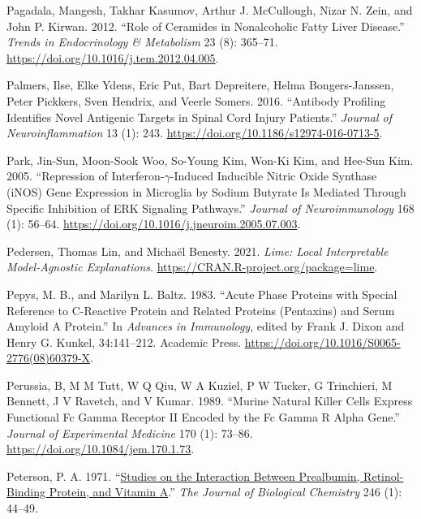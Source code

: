 \documentclass[9pt,lineno]{elife}
\newlength{\cslhangindent}
\newlength{\cslentryspacingunit} %
\newenvironment{CSLReferences}[2] %
 {%
  \setlength{\parindent}{0pt}
  \ifodd #1
  \let\oldpar\par
  \def\par{\hangindent=\cslhangindent\oldpar}
  \fi
  \setlength{\parskip}{#2\cslentryspacingunit}
 }%
 {}
\begin{document}
\begin{CSLReferences}{1}{0}
\leavevmode{}%
Pagadala, Mangesh, Takhar Kasumov, Arthur J. McCullough, Nizar N. Zein, and John P. Kirwan. 2012. {``Role of Ceramides in Nonalcoholic Fatty Liver Disease.''} \emph{Trends in Endocrinology \& Metabolism} 23 (8): 365--71. \url{https://doi.org/10.1016/j.tem.2012.04.005}.

\leavevmode{}%
Palmers, Ilse, Elke Ydens, Eric Put, Bart Depreitere, Helma Bongers-Janssen, Peter Pickkers, Sven Hendrix, and Veerle Somers. 2016. {``Antibody Profiling Identifies Novel Antigenic Targets in Spinal Cord Injury Patients.''} \emph{Journal of Neuroinflammation} 13 (1): 243. \url{https://doi.org/10.1186/s12974-016-0713-5}.

\leavevmode{}%
Park, Jin-Sun, Moon-Sook Woo, So-Young Kim, Won-Ki Kim, and Hee-Sun Kim. 2005. {``Repression of Interferon-{\(\gamma\)}-Induced Inducible Nitric Oxide Synthase ({iNOS}) Gene Expression in Microglia by Sodium Butyrate Is Mediated Through Specific Inhibition of {ERK} Signaling Pathways.''} \emph{Journal of Neuroimmunology} 168 (1): 56--64. \url{https://doi.org/10.1016/j.jneuroim.2005.07.003}.

\leavevmode{}%
Pedersen, Thomas Lin, and Michaël Benesty. 2021. \emph{Lime: Local Interpretable Model-Agnostic Explanations}. \url{https://CRAN.R-project.org/package=lime}.

\leavevmode{}%
Pepys, M. B., and Marilyn L. Baltz. 1983. {``Acute {Phase Proteins} with {Special Reference} to {C-Reactive Protein} and {Related Proteins} ({Pentaxins}) and {Serum Amyloid A Protein}.''} In \emph{Advances in {Immunology}}, edited by Frank J. Dixon and Henry G. Kunkel, 34:141--212. {Academic Press}. \url{https://doi.org/10.1016/S0065-2776(08)60379-X}.

\leavevmode{}%
Perussia, B, M M Tutt, W Q Qiu, W A Kuziel, P W Tucker, G Trinchieri, M Bennett, J V Ravetch, and V Kumar. 1989. {``Murine Natural Killer Cells Express Functional {Fc} Gamma Receptor {II} Encoded by the {Fc} Gamma {R} Alpha Gene.''} \emph{Journal of Experimental Medicine} 170 (1): 73--86. \url{https://doi.org/10.1084/jem.170.1.73}.

\leavevmode{}%
Peterson, P. A. 1971. {``\href{https://www.ncbi.nlm.nih.gov/pubmed/5541771}{Studies on the Interaction Between Prealbumin, Retinol-Binding Protein, and Vitamin {A}}.''} \emph{The Journal of Biological Chemistry} 246 (1): 44--49.


\end{CSLReferences}
\end{document}
